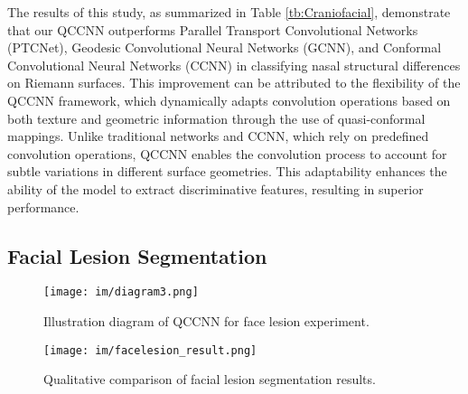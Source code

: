 The results of this study, as summarized in Table \ref{tb:Craniofacial}, demonstrate that our QCCNN outperforms Parallel Transport Convolutional Networks (PTCNet), Geodesic Convolutional Neural Networks (GCNN), and Conformal Convolutional Neural Networks (CCNN) in classifying nasal structural differences on Riemann surfaces. This improvement can be attributed to the flexibility of the QCCNN framework, which dynamically adapts convolution operations based on both texture and geometric information through the use of quasi-conformal mappings. Unlike traditional networks and CCNN, which rely on predefined convolution operations, QCCNN enables the convolution process to account for subtle variations in different surface geometries. This adaptability enhances the ability of the model to extract discriminative features, resulting in superior performance.



\subsection{Facial Lesion Segmentation}
\label{sec:self_ablation}



\begin{figure}
    \centering
    \texttt{[image: im/diagram3.png]}
    \caption{Illustration diagram of QCCNN for face lesion experiment.}
    \label{fig:diagram3}
\end{figure}

\begin{figure}
    \centering
    \texttt{[image: im/facelesion\_result.png]}
    \caption{Qualitative comparison of facial lesion segmentation results.}
    \label{fig:facelesion}
\end{figure}

